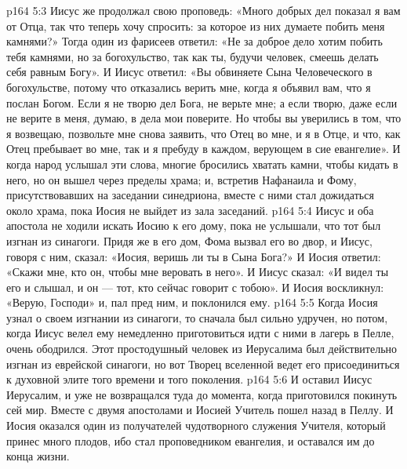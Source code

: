 \vs p164 5:3 Иисус же продолжал свою проповедь: «Много добрых дел показал я вам от Отца, так что теперь хочу спросить: за которое из них думаете побить меня камнями?» Тогда один из фарисеев ответил: «Не за доброе дело хотим побить тебя камнями, но за богохульство, так как ты, будучи человек, смеешь делать себя равным Богу». И Иисус ответил: «Вы обвиняете Сына Человеческого в богохульстве, потому что отказались верить мне, когда я объявил вам, что я послан Богом. Если я не творю дел Бога, не верьте мне; а если творю, даже если не верите в меня, думаю, в дела мои поверите. Но чтобы вы уверились в том, что я возвещаю, позвольте мне снова заявить, что Отец во мне, и я в Отце, и что, как Отец пребывает во мне, так и я пребуду в каждом, верующем в сие евангелие». И когда народ услышал эти слова, многие бросились хватать камни, чтобы кидать в него, но он вышел через пределы храма; и, встретив Нафанаила и Фому, присутствовавших на заседании синедриона, вместе с ними стал дожидаться около храма, пока Иосия не выйдет из зала заседаний.
\vs p164 5:4 Иисус и оба апостола не ходили искать Иосию к его дому, пока не услышали, что тот был изгнан из синагоги. Придя же в его дом, Фома вызвал его во двор, и Иисус, говоря с ним, сказал: «Иосия, веришь ли ты в Сына Бога?» И Иосия ответил: «Скажи мне, кто он, чтобы мне веровать в него». И Иисус сказал: «И видел ты его и слышал, и он --- тот, кто сейчас говорит с тобою». И Иосия воскликнул: «Верую, Господи» и, пал пред ним, и поклонился ему.
\vs p164 5:5 Когда Иосия узнал о своем изгнании из синагоги, то сначала был сильно удручен, но потом, когда Иисус велел ему немедленно приготовиться идти с ними в лагерь в Пелле, очень ободрился. Этот простодушный человек из Иерусалима был действительно изгнан из еврейской синагоги, но вот Творец вселенной ведет его присоединиться к духовной элите того времени и того поколения.
\vs p164 5:6 И оставил Иисус Иерусалим, и уже не возвращался туда до момента, когда приготовился покинуть сей мир. Вместе с двумя апостолами и Иосией Учитель пошел назад в Пеллу. И Иосия оказался один из получателей чудотворного служения Учителя, который принес много плодов, ибо стал проповедником евангелия, и оставался им до конца жизни.
